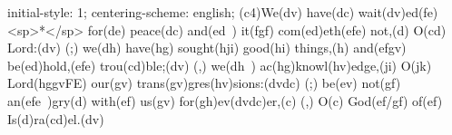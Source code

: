 initial-style: 1;
centering-scheme: english;
(c4)We(dv) have(dc) wait(dv)ed(fe) <sp>*</sp> for(de) peace(dc) and(ed~) it(fgf) com(ed)eth(efe) not,(d) O(cd) Lord:(dv) (;) we(dh) have(hg) sought(hji) good(hi) things,(h) and(efgv) be(ed)hold,(efe) trou(cd)ble;(dv) (,) we(dh~) ac(hg)knowl(hv)edge,(ji) O(jk) Lord(hggvFE) our(gv) trans(gv)gres(hv)sions:(dvdc) (;) be(ev) not(gf) an(efe~)gry(d) with(ef) us(gv) for(gh)ev(dvdc)er,(c) (,) O(c) God(ef/gf) of(ef) Is(d)ra(cd)el.(dv)
